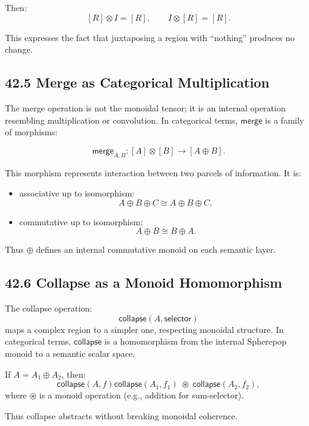 \documentclass[12pt,letterpaper]{article}
\theoremstyle{remark}
\begin{document}
Then:
\[
[R] \otimes I = [R], \qquad I \otimes [R] = [R].
\]

This expresses the fact that juxtaposing a region with ``nothing'' produces no change.

\subsection{42.5 Merge as Categorical Multiplication}

The merge operation is not the monoidal tensor; it is an internal operation resembling multiplication or convolution. In categorical terms, $\mathsf{merge}$ is a family of morphisms:

\[
\mathsf{merge}_{A,B} : [A] \otimes [B] \to [A \oplus B].
\]

This morphism represents interaction between two parcels of information. It is:

\begin{itemize}
    \item associative up to isomorphism:
    \[
    A \oplus B \oplus C \cong A \oplus B \oplus C,
    \]
    \item commutative up to isomorphism:
    \[
    A \oplus B \cong B \oplus A.
    \]
\end{itemize}

Thus $\oplus$ defines an internal commutative monoid on each semantic layer.

\subsection{42.6 Collapse as a Monoid Homomorphism}

The collapse operation:
\[
\mathsf{collapse}(A, \mathsf{selector})
\]
maps a complex region to a simpler one, respecting monoidal structure. In categorical terms, $\mathsf{collapse}$ is a homomorphism from the internal Spherepop monoid to a semantic scalar space.

If $A = A_1 \oplus A_2$, then:
\[
\mathsf{collapse}(A, f)
\mathsf{collapse}(A_1, f_1) \;\circledast\;
\mathsf{collapse}(A_2, f_2),
\]
where $\circledast$ is a monoid operation (e.g., addition for sum-selector).

Thus collapse abstracts without breaking monoidal coherence.
\end{document}
